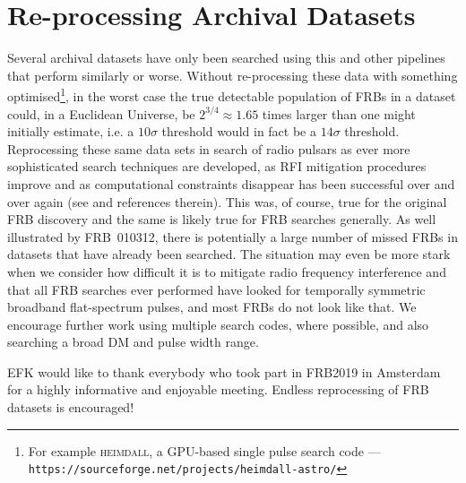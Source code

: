 \documentclass[RNAAS]{aastex62}
\begin{document}
\section{Re-processing Archival Datasets}

Several archival datasets have only been searched using this and other pipelines that perform similarly or worse. Without re-processing these data with something optimised\footnote{For example \textsc{heimdall}, a GPU-based single pulse search code --- \texttt{https://sourceforge.net/projects/heimdall-astro/}}, in the worst case the true detectable population of FRBs in a dataset could, in a Euclidean Universe, be $2^{3/4}\approx 1.65$ times larger than one might initially estimate, i.e. a $10\sigma$ threshold would in fact be a $14\sigma$ threshold. Reprocessing these same data sets in search of radio pulsars as ever more sophisticated search techniques are developed, as RFI mitigation procedures improve and as computational constraints disappear has been successful over and over again (see \citealt{einstein} and references therein). This was, of course, true for the original FRB discovery and the same is likely true for FRB searches generally. As well illustrated by FRB~010312, there is potentially a large number of missed FRBs in datasets that have already been searched. The situation may even be more stark when we consider how difficult it is to mitigate radio frequency interference and that all FRB searches ever performed have looked for temporally symmetric broadband flat-spectrum pulses, and most FRBs do not look like that. We encourage further work using multiple search codes, where possible, and also searching a broad DM and pulse width range.

\acknowledgements

EFK would like to thank everybody who took part in FRB2019 in Amsterdam for a highly informative and enjoyable meeting. Endless reprocessing of FRB datasets is encouraged!

\begin{samepage}


\end{samepage}

%
%
\end{document}
